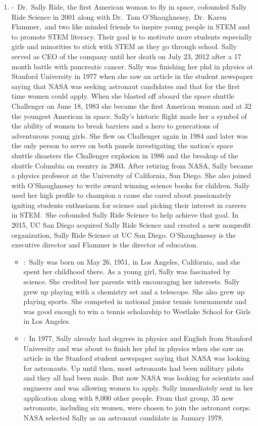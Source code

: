 \documentclass[12pt,a4paper]{article}
\begin{document}
\begin{enumerate}
    \item {} -\ Dr.\ Sally Ride, the first American woman to fly in space, cofounded Sally Ride Science in 2001 along with Dr.\ Tam O'Shaughnessy,\ Dr.\ Karen Flammer,\ and two like minded friends to inspire young people in STEM and to promote STEM literacy. Their goal is to motivate more students especially girls and minorities to stick with STEM as they go through school. Sally served as CEO of the company until her death on July 23, 2012 after a 17 month battle with pancreatic cancer. Sally was finishing her phd in physics at Stanford University in 1977 when she saw an article in the student newspaper saying that NASA was seeking astronaut candidates and that for the first time women could apply. When she blasted off aboard the space shuttle Challenger on June 18, 1983 she became the first American woman and at 32 the youngest American in space. Sally's historic flight made her a symbol of the ability of women to break barriers and a hero to generations of adventurous young girls. She flew on Challenger again in 1984 and later was the only person to serve on both panels investigating the nation's space shuttle disasters the Challenger explosion in 1986 and the breakup of the shuttle Columbia on reentry in 2003. After retiring from NASA, Sally became a physics professor at the University of California, San Diego. She also joined with O'Shaughnessy to write award winning science books for children. Sally used her high profile to champion a cause she cared about passionately igniting students enthusiasm for science and picking their interest in careers in STEM.\ She cofounded Sally Ride Science to help achieve that goal. In 2015, UC San Diego acquired Sally Ride Science and created a new nonprofit organization, Sally Ride Science at UC San Diego. O’Shaughnessy is the executive director and Flammer is the director of education.
    \begin{itemize}
      \item {}:\ Sally was born on May 26, 1951, in Los Angeles, California, and she spent her childhood there. As a young girl, Sally was fascinated by science. She credited her parents with encouraging her interests. Sally grew up playing with a chemistry set and a telescope. She also grew up playing sports. She competed in national junior tennis tournaments and was good enough to win a tennis scholarship to Westlake School for Girls in Los Angeles.
      \item {}:\ In 1977, Sally already had degrees in physics and English from Stanford University and was about to finish her phd in physics when she saw an article in the Stanford student newspaper saying that NASA was looking for astronauts. Up until then, most astronauts had been military pilots and they all had been male. But now NASA was looking for scientists and engineers and was allowing women to apply. Sally immediately sent in her application along with 8,000 other people. From that group, 35 new astronauts, including six women, were chosen to join the astronaut corps. NASA selected Sally as an astronaut candidate in January 1978.

\end{itemize}
\end{enumerate}
\end{document}
